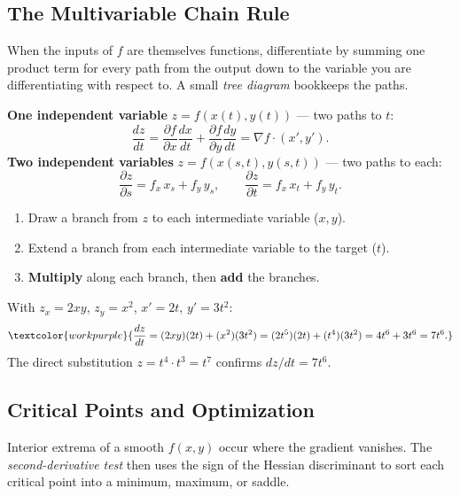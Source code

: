 \subsection{The Multivariable Chain Rule}

When the inputs of $f$ are themselves functions, differentiate by summing one
product term for every path from the output down to the variable you are
differentiating with respect to. A small \emph{tree diagram} bookkeeps the paths.

\begin{methodbox}
\textbf{One independent variable} $z=f(x(t),y(t))$ --- two paths to $t$:
\[ \frac{dz}{dt} = \frac{\partial f}{\partial x}\frac{dx}{dt}
                 + \frac{\partial f}{\partial y}\frac{dy}{dt}
                 = \nabla f \cdot (x',y'). \]
\textbf{Two independent variables} $z=f(x(s,t),y(s,t))$ --- two paths to each:
\[ \frac{\partial z}{\partial s} = f_x\,x_s + f_y\,y_s,
   \qquad
   \frac{\partial z}{\partial t} = f_x\,x_t + f_y\,y_t. \]
\begin{enumerate}[leftmargin=1.6em, itemsep=2pt]
    \item Draw a branch from $z$ to each intermediate variable ($x,y$).
    \item Extend a branch from each intermediate variable to the target ($t$).
    \item \textbf{Multiply} along each branch, then \textbf{add} the branches.
\end{enumerate}
\end{methodbox}

\begin{examplebox}[Worked Example 6.4: Chain rule for $z=x^2y$, $x=t^2$, $y=t^3$]
With $z_x=2xy$, $z_y=x^2$, $x'=2t$, $y'=3t^2$:
\[ \textcolor{workpurple}{\frac{dz}{dt} = (2xy)(2t) + (x^2)(3t^2)
   = (2t^5)(2t) + (t^4)(3t^2) = 4t^6 + 3t^6 = 7t^6.} \]
The direct substitution $z=t^4\cdot t^3=t^7$ confirms $dz/dt=7t^6$.
\end{examplebox}

\subsection{Critical Points and Optimization}

Interior extrema of a smooth $f(x,y)$ occur where the gradient vanishes. The
\emph{second-derivative test} then uses the sign of the Hessian discriminant to
sort each critical point into a minimum, maximum, or saddle.

